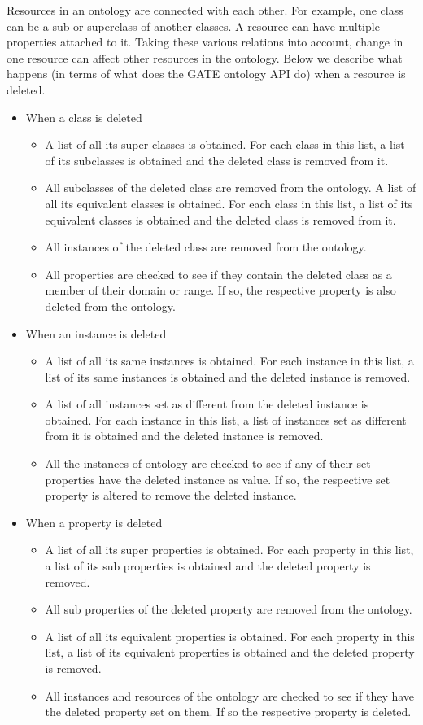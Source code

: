Resources in an ontology are connected with each other. For example,
one class can be a sub or superclass of another classes. A resource can
have multiple properties attached to it. Taking these various
relations into account, change in one resource can affect other
resources in the ontology. Below we describe what happens (in terms
of what does the GATE ontology API do) when a resource is
deleted.
\begin{itemize}
\item When a class is deleted
\begin{itemize}
\item A list of all its super classes is obtained. For each class in this list,
a list of its subclasses is obtained and the deleted class is removed from it.
\item All subclasses of the deleted class are removed from the ontology. A list
of all its equivalent classes is obtained. For each class in this list, a list
of its equivalent classes is obtained and the deleted class is removed from it.
\item All instances of the deleted class are removed from the ontology.
\item All properties are checked to see if they contain the deleted class as a
member of their domain or range. If so, the respective property is also deleted
from the ontology.
\end{itemize}
\item When an instance is deleted
\begin{itemize}
\item A list of all its same instances is obtained. For each instance in this
list, a list of its same instances is obtained and the deleted instance is
removed.
\item A list of all instances set as different from the deleted instance is
obtained. For each instance in this list, a list of instances set as different
from it is obtained and the deleted instance is removed.
\item All the instances of ontology are checked to see if any of their set
properties have the deleted instance as value. If so, the respective set
property is altered to remove the deleted instance.
\end{itemize}
\item When a property is deleted
\begin{itemize}
\item A list of all its super properties is obtained. For each property in this
list, a list of its sub properties is obtained and the deleted property is
removed.
\item All sub properties of the deleted property are removed from the ontology. 
\item A list of all its equivalent properties is obtained. For each property in
this list, a list of its equivalent properties is obtained and the deleted
property is removed.
\item All instances and resources of the ontology are checked to see if they
have the deleted property set on them. If so the respective property is
deleted.
\end{itemize}
\end{itemize}

